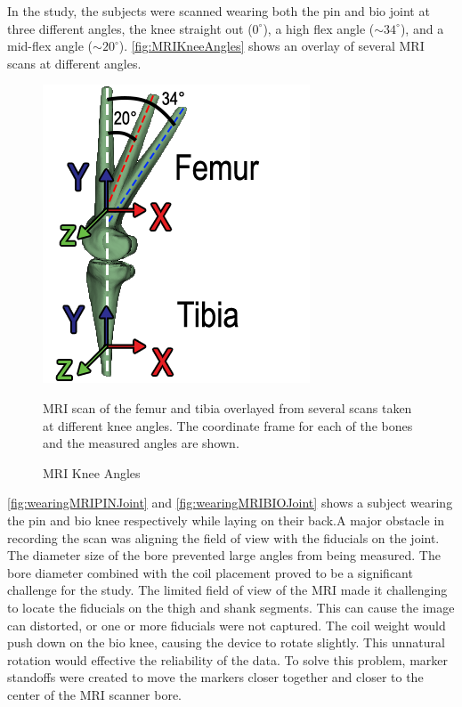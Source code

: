 In the study, the subjects were scanned wearing both the pin and bio joint at three different angles, the knee straight out ($0^{\circ}$), a high flex angle ($\sim34^{\circ}$),  and a mid-flex angle  ($\sim20^{\circ}$). \autoref{fig:MRIKneeAngles} shows an overlay of several MRI scans at different angles. 


\begin{figure}[ht!]
    \centering
    \includegraphics{images/mech_design/mri_knee_angles.png}
    \caption{MRI Knee Angles}{MRI scan of the femur and tibia overlayed from several scans taken at different knee angles. The coordinate frame for each of the bones and the measured angles are shown.}
    \label{fig:MRIKneeAngles}
\end{figure}

\autoref{fig:wearingMRIPINJoint} and \autoref{fig:wearingMRIBIOJoint} shows a subject wearing the pin and bio knee respectively while laying on their back.A major obstacle in recording the scan was aligning the field of view with the fiducials on the joint. The diameter size of the bore prevented large angles from being measured. The bore diameter combined with the coil placement proved to be a significant challenge for the study. The limited field of view of the MRI made it challenging to locate the fiducials on the thigh and shank segments. This can cause the image can distorted, or one or more fiducials were not captured. The coil weight would push down on the bio knee, causing the device to rotate slightly.  This unnatural rotation would effective the reliability of the data. To solve this problem, marker standoffs were created to move the markers closer together and closer to the center of the MRI scanner bore. 


